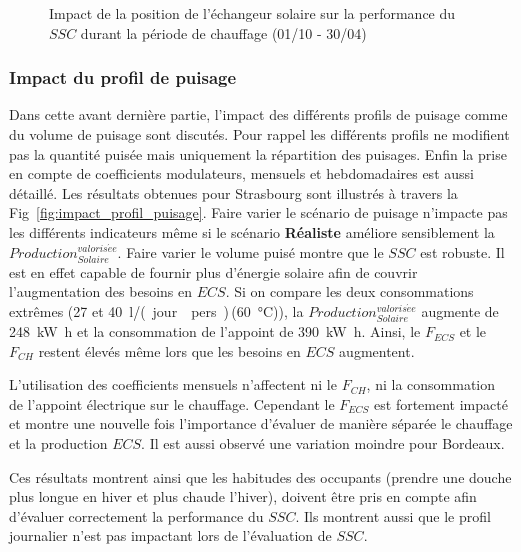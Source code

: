 \begin{figure}
    \begin{center}
    \end{center}
    \caption{Impact de la position de l’échangeur solaire sur la performance
             du $SSC$ durant la période de chauffage (01/10 - 30/04)
             \label{fig:impact_pos_ech}}
\end{figure}


\subsubsection{Impact du profil de puisage} %
\label{ssub:impact_du_profil_de_puisage}
Dans cette avant dernière partie, l’impact des différents profils de puisage comme
du volume de puisage sont discutés. Pour rappel
les différents profils ne modifient pas la quantité puisée mais uniquement la répartition
des puisages. Enfin la prise en compte de coefficients modulateurs, mensuels et hebdomadaires
est aussi détaillé.
Les résultats obtenues pour Strasbourg sont illustrés à travers la Fig~\ref{fig:impact_profil_puisage}.
Faire varier le scénario de puisage n’impacte pas les différents indicateurs
même si le scénario \textbf{Réaliste} améliore sensiblement la  $Production_{Solaire}^{valoris\acute ee}$.
Faire varier le volume puisé montre que le $SSC$ est robuste. Il est en effet capable de
fournir plus d’énergie solaire afin de couvrir l’augmentation des besoins en $ECS$. Si
on compare les deux consommations extrêmes (\num{27} et \SI{40}{\litre/(jour\period pers)}\,(\SI{60}{\celsius})),
la $Production_{Solaire}^{valoris\acute ee}$ augmente de \SI{248}{\kilo\watt\hour} et la consommation
de l’appoint de \SI{390}{\kilo\watt\hour}. Ainsi, le $F_{ECS}$ et le $F_{CH}$
restent élevés même lors que les besoins en $ECS$ augmentent.

L’utilisation des coefficients mensuels n’affectent ni le $F_{CH}$, ni la consommation de l’appoint électrique sur le chauffage.
Cependant le $F_{ECS}$ est fortement impacté et montre une nouvelle fois l’importance
d’évaluer de manière séparée le chauffage et la production $ECS$. Il est aussi observé
une variation moindre pour Bordeaux.

Ces résultats montrent ainsi que les habitudes des occupants (prendre une douche
plus longue en hiver et plus chaude l’hiver), doivent être pris en compte afin d’évaluer correctement la
performance du $SSC$. Ils montrent aussi que le profil journalier n’est pas impactant
lors de l’évaluation de $SSC$.

